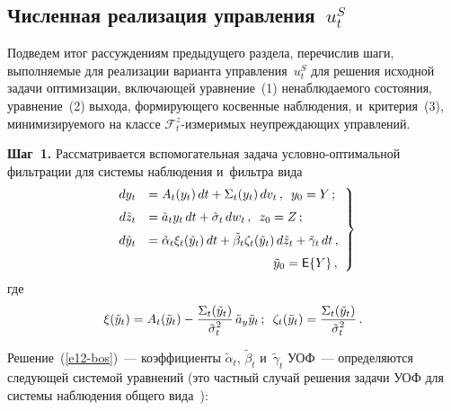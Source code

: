 \begin{multicols}{2}
\section{Численная реализация управления~$u_t^S$}

     Подведем итог рассуждениям предыдущего раздела, перечислив шаги, 
выполняемые для реализации варианта управления~$u_t^S$ для решения 
исходной задачи оптимизации, включающей уравнение~(1) ненаблюдаемого 
состояния, уравнение~(2) выхода, формирующего косвенные наблюдения, 
и~критерия~(3), минимизируемого на классе $\mathcal{F}_t^z$-из\-ме\-ри\-мых 
неупреждающих управлений.
     
    \textbf{Шаг~1.} Рассматривается вспомогательная задача условно-оптимальной 
фильтрации для системы наблюдения и~фильтра вида
     \begin{equation}
     \left.
     \begin{array}{rl}
     dy_t&= A_t(y_t)\,dt+\Sigma_t(y_t)\,dv_t\,,\enskip y_0=Y\,;\\[6pt]
     d\tilde{z}_t&= \tilde{a}_t y_t\,dt+\tilde{\sigma}_t \,dw_t\,,\enskip 
z_0=Z\,;\\[6pt]
     d\tilde{y}_t&= \tilde{\alpha}_t\xi_t(\tilde{y}_t)\,dt 
+\tilde{\beta}_t\zeta_t(\tilde{y}_t)\,d\tilde{z}_t+\tilde{\gamma}_t\,dt\,,
\\[6pt]
&\hspace*{35mm}\tilde{y}_0={\sf E}\{Y\}\,,
\end{array}
\right\}
     \label{e12-bos}
\end{equation}
где
$$
     \xi(\tilde{y}_t)=A_t(\tilde{y}_t)-
\displaystyle\frac{\displaystyle \Sigma_t(\tilde{y}_t)\mathstrut}{\displaystyle \tilde{\sigma}_t^2\mathstrut}\,\tilde{a}_y\tilde{y}_t\,;\enskip 
\zeta_t(\tilde{y}_t)= \displaystyle\frac{\displaystyle \Sigma_t(\tilde{y}_t)\mathstrut}{\displaystyle \tilde{\sigma}_t^2\mathstrut}\,.
  $$
     
     Решение~(\ref{e12-bos})~--- коэффициенты $\tilde{\alpha}_t$, 
$\tilde{\beta}_t$ и~$\tilde{\gamma}_t$ УОФ~--- определяются следующей системой 
уравнений (это частный случай решения задачи УОФ для системы 
наблюдения общего вида~\cite{8-bos}):


\end{multicols}
